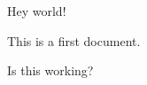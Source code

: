 \documentclass{article}
\begin{document}
Hey world!

This is a first document.

Is this working?
\end{document}
